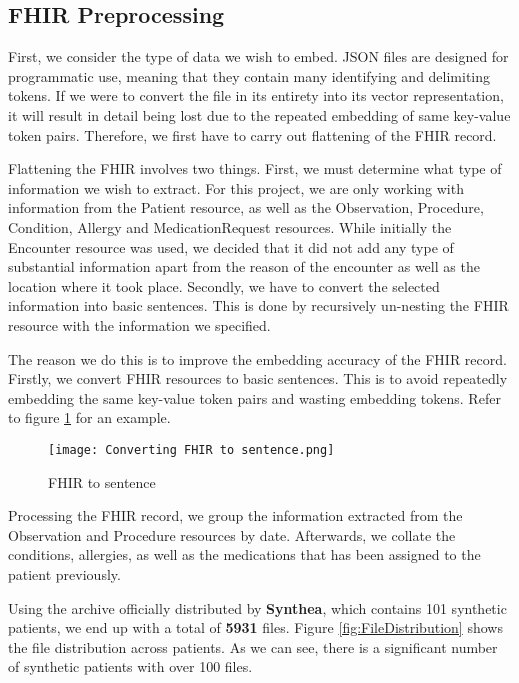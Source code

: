\subsection{FHIR Preprocessing}

First, we consider the type of data we wish to embed. JSON files are designed for programmatic use, meaning that they contain many identifying and delimiting tokens. If we were to convert the file in its entirety into its vector representation, it will result in detail being lost due to the repeated embedding of same key-value token pairs. Therefore, we first have to carry out flattening of the FHIR record.

Flattening the FHIR involves two things. First, we must determine what type of information we wish to extract. For this project, we are only working with information from the Patient resource, as well as the Observation, Procedure, Condition, Allergy and MedicationRequest resources. While initially the Encounter resource was used, we decided that it did not add any type of substantial information apart from the reason of the encounter as well as the location where it took place. Secondly, we have to convert the selected information into basic sentences. This is done by recursively un-nesting the FHIR resource with the information we specified.

The reason we do this is to improve the embedding accuracy of the FHIR record.
Firstly, we convert FHIR resources to basic sentences.
This is to avoid repeatedly embedding the same key-value token pairs and wasting embedding tokens.
Refer to figure \ref{fig:FHIRtoSentence} for an example.

\begin{figure}
	\texttt{[image: Converting FHIR to sentence.png]}
	\caption{FHIR to sentence}
	\centering
	\label{fig:FHIRtoSentence}
\end{figure}

Processing the FHIR record, we group the information extracted from the Observation and Procedure resources by date. Afterwards, we collate the conditions, allergies, as well as the medications that has been assigned to the patient previously.

Using the archive officially distributed by \textbf{Synthea}, which contains 101 synthetic patients, we end up with a total of \textbf{5931} files. Figure \ref{fig:FileDistribution} shows the file distribution across patients. As we can see, there is a significant number of synthetic patients with over 100 files.

